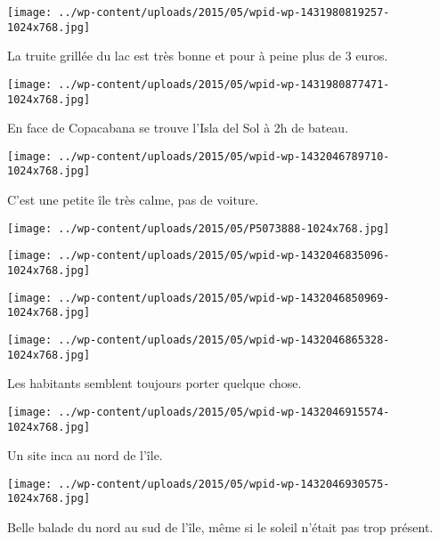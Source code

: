  \newline
\centerline{\texttt{[image: ../wp-content/uploads/2015/05/wpid-wp-1431980819257-1024x768.jpg]} } 
 \newline
 La truite grillée du lac est très bonne et pour à peine plus de 3 euros. \newline
 \newline
\centerline{\texttt{[image: ../wp-content/uploads/2015/05/wpid-wp-1431980877471-1024x768.jpg]} } 
 \newline
 En face de Copacabana se trouve l'Isla del Sol à 2h de bateau. \newline
 \newline
\centerline{\texttt{[image: ../wp-content/uploads/2015/05/wpid-wp-1432046789710-1024x768.jpg]} } 
 \newline
 C'est une petite île très calme, pas de voiture. \newline
 \newline
\centerline{\texttt{[image: ../wp-content/uploads/2015/05/P5073888-1024x768.jpg]} } 
 \newline
 \newline
\centerline{\texttt{[image: ../wp-content/uploads/2015/05/wpid-wp-1432046835096-1024x768.jpg]} } 
 \newline
 \newline
\centerline{\texttt{[image: ../wp-content/uploads/2015/05/wpid-wp-1432046850969-1024x768.jpg]} } 
 \newline
 \newline
\centerline{\texttt{[image: ../wp-content/uploads/2015/05/wpid-wp-1432046865328-1024x768.jpg]} } 
 \newline
 Les habitants semblent toujours porter quelque chose. \newline
 \newline
\centerline{\texttt{[image: ../wp-content/uploads/2015/05/wpid-wp-1432046915574-1024x768.jpg]} } 
 \newline
 Un site inca au nord de l'île. \newline
 \newline
\centerline{\texttt{[image: ../wp-content/uploads/2015/05/wpid-wp-1432046930575-1024x768.jpg]} } 
 \newline
 Belle balade du nord au sud de l'île, même si le soleil n'était pas trop présent. \newline
 \newline
